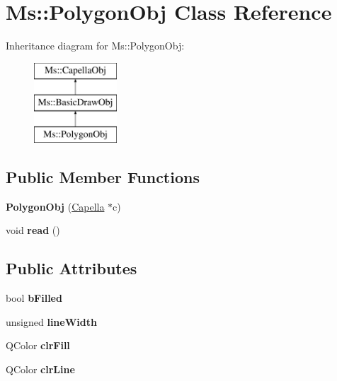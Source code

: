 \hypertarget{class_ms_1_1_polygon_obj}{}\section{Ms\+:\+:Polygon\+Obj Class Reference}
\label{class_ms_1_1_polygon_obj}
Inheritance diagram for Ms\+:\+:Polygon\+Obj\+:\begin{figure}[H]
\begin{center}
\leavevmode
\includegraphics[height=3.000000cm]{class_ms_1_1_polygon_obj}
\end{center}
\end{figure}
\subsection*{Public Member Functions}
\begin{DoxyCompactItemize}
\item 
\mbox{\label{class_ms_1_1_polygon_obj_afcf942fddb5c6e76ca0eb02f587d3e93}} 
{\bfseries Polygon\+Obj} (\hyperlink{class_ms_1_1_capella}{Capella} $\ast$c)
\item 
\mbox{\label{class_ms_1_1_polygon_obj_aab79cbf0bbacbbac597f293245b74669}} 
void {\bfseries read} ()
\end{DoxyCompactItemize}
\subsection*{Public Attributes}
\begin{DoxyCompactItemize}
\item 
\mbox{\label{class_ms_1_1_polygon_obj_a83526d9894cfc0f8614b33155c3d2e98}} 
bool {\bfseries b\+Filled}
\item 
\mbox{\label{class_ms_1_1_polygon_obj_a9ba58db55794acfdff757ba6bb0b51a4}} 
unsigned {\bfseries line\+Width}
\item 
\mbox{\label{class_ms_1_1_polygon_obj_a53cf3d25974cde06c2823a99dc3c7207}} 
Q\+Color {\bfseries clr\+Fill}
\item 
\mbox{\label{class_ms_1_1_polygon_obj_a7389cdc525d4ff71df3a2c0298657694}} 
Q\+Color {\bfseries clr\+Line}
\end{DoxyCompactItemize}
